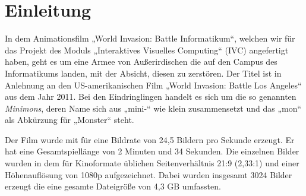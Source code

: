 \section{Einleitung}

In dem Animationsfilm „World Invasion: Battle Informatikum“, welchen wir für das Projekt des Moduls „Interaktives Visuelles Computing“ (IVC) angefertigt haben, geht es um eine Armee von Außerirdischen die auf den Campus des Informatikums landen, mit der Absicht, diesen zu zerstören. Der Titel ist in Anlehnung an den US-amerikanischen Film „World Invasion: Battle Los Angeles“ aus dem Jahr 2011. Bei den Eindringlingen handelt es sich um die so genannten \textit{Minimons}, deren Name sich aus „mini-“ wie klein zusammensetzt und das „mon“ als Abkürzung für „Monster“ steht.

Der Film wurde mit \Povray für eine Bildrate von 24,5 Bildern pro Sekunde erzeugt. Er hat eine Gesamtspiellänge von 2 Minuten und 34 Sekunden. Die einzelnen Bilder wurden in dem für Kinoformate üblichen Seitenverhältnis 21:9 (2,33:1) und einer Höhenauflösung von 1080p aufgezeichnet. Dabei wurden insgesamt 3024 Bilder erzeugt die eine gesamte Dateigröße von 4,3 GB umfassten.
